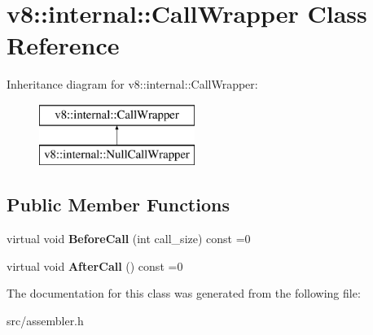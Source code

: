 \hypertarget{classv8_1_1internal_1_1_call_wrapper}{}\section{v8\+:\+:internal\+:\+:Call\+Wrapper Class Reference}
\label{classv8_1_1internal_1_1_call_wrapper}
Inheritance diagram for v8\+:\+:internal\+:\+:Call\+Wrapper\+:\begin{figure}[H]
\begin{center}
\leavevmode
\includegraphics[height=2.000000cm]{classv8_1_1internal_1_1_call_wrapper}
\end{center}
\end{figure}
\subsection*{Public Member Functions}
\begin{DoxyCompactItemize}
\item 
\hypertarget{classv8_1_1internal_1_1_call_wrapper_abd7fdb2212c8fe4a64cd850428ae54a0}{}virtual void {\bfseries Before\+Call} (int call\+\_\+size) const =0\label{classv8_1_1internal_1_1_call_wrapper_abd7fdb2212c8fe4a64cd850428ae54a0}

\item 
\hypertarget{classv8_1_1internal_1_1_call_wrapper_adb4927b4d316ec47a0b65f6c1ff04883}{}virtual void {\bfseries After\+Call} () const =0\label{classv8_1_1internal_1_1_call_wrapper_adb4927b4d316ec47a0b65f6c1ff04883}

\end{DoxyCompactItemize}


The documentation for this class was generated from the following file\+:\begin{DoxyCompactItemize}
\item 
src/assembler.\+h\end{DoxyCompactItemize}

